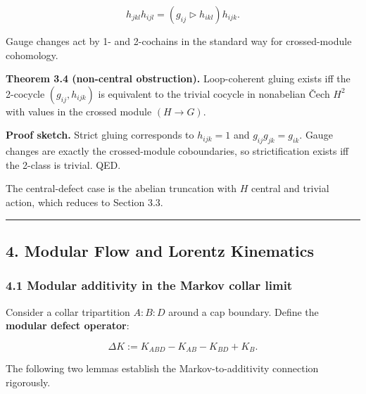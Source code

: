 \documentclass[
]{article}
\begin{document}
\[
h_{jkl} h_{ijl} = (g_{ij} \triangleright h_{ikl}) h_{ijk}.
\]

Gauge changes act by 1- and 2-cochains in the standard way for
crossed-module cohomology.

\textbf{Theorem 3.4 (non-central obstruction).} Loop-coherent gluing
exists iff the 2-cocycle \((g_{ij}, h_{ijk})\) is equivalent to the
trivial cocycle in nonabelian Čech \(H^2\) with values in the crossed
module \((H \to G)\).

\textbf{Proof sketch.} Strict gluing corresponds to \(h_{ijk}=1\) and
\(g_{ij}g_{jk}=g_{ik}\). Gauge changes are exactly the crossed-module
coboundaries, so strictification exists iff the 2-class is trivial. QED.

The central-defect case is the abelian truncation with \(H\) central and
trivial action, which reduces to Section 3.3.

\begin{center}\rule{0.5\linewidth}{0.5pt}\end{center}

\subsection{4. Modular Flow and Lorentz
Kinematics}\label{modular-flow-and-lorentz-kinematics}

\subsubsection{4.1 Modular additivity in the Markov collar
limit}\label{modular-additivity-in-the-markov-collar-limit}

Consider a collar tripartition \(A:B:D\) around a cap boundary. Define
the \textbf{modular defect operator}:

\[
\Delta K := K_{ABD} - K_{AB} - K_{BD} + K_B.
\]

The following two lemmas establish the Markov-to-additivity connection
rigorously.
\end{document}
